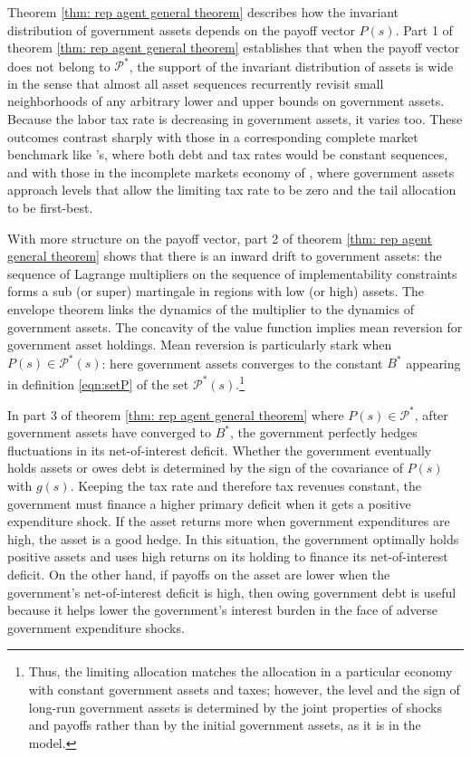 \documentclass[thmsb,11pt]{article}
\begin{document}
\color{black}
Theorem \ref{thm: rep agent general theorem}  describes how  the invariant distribution of government assets depends on the payoff vector $P(s)$.
Part 1 of theorem \ref{thm: rep agent general theorem}  establishes that when the payoff vector does  not belong to $\mathcal{P}^*$, the support of the invariant distribution of assets is wide in the sense that almost all
asset sequences recurrently revisit  small neighborhoods of  any arbitrary lower and upper bounds on government assets.
Because the labor tax rate is decreasing in government assets, it varies too. These outcomes contrast sharply with those   in a corresponding complete market benchmark
like \citeauthor{LucasJr.1983}'s, where both debt and tax rates would be constant  sequences,  and with those in the incomplete markets economy of  \citeauthor{Aiyagari2002},
  where government assets approach levels that allow the  limiting tax rate to be zero and the tail allocation to be first-best.

With more structure on the payoff vector, part 2 of  theorem \ref{thm: rep agent general theorem} shows that there is an  inward drift to government assets:
the sequence of Lagrange multipliers on the sequence of implementability constraints forms a sub (or super) martingale in  regions with low (or high) assets.
The envelope theorem links the dynamics of the multiplier to the dynamics  of government assets.  The concavity of the value function implies
mean reversion for government  asset holdings. Mean reversion is particularly stark when $P(s)\in \mathcal{P}^*(s)$: here  government assets converges to
the constant $B^*$ appearing in  definition \eqref{eqn:setP} of the set $\mathcal{P}^*(s)$.\footnote{Thus, the limiting allocation matches the allocation in
a particular \citeauthor{LucasJr.1983} economy  with constant government  assets and taxes; however,
the level and the sign of long-run government assets is determined by the joint properties of shocks and payoffs rather than
by the initial government assets,  as it is in the \citeauthor{LucasJr.1983} model.}



In part 3 of theorem \ref{thm: rep agent general theorem} where  $P(s)\in\mathcal{P}^*$,
after government assets have converged to $B^*$, %
the government perfectly hedges fluctuations in
its net-of-interest deficit.   Whether the government eventually holds assets or owes  debt is determined
by the sign of the covariance of $P(s)$ with $g(s)$.
Keeping the tax rate and therefore tax revenues constant, the government must finance
a higher primary deficit when it gets a positive expenditure shock.
If the asset returns more when government expenditures are high, the asset is a good hedge. In this situation, the government optimally holds positive assets and uses high returns
on its holding to finance its  net-of-interest deficit. On the other hand,  if  payoffs on the asset  are lower  when the
government's net-of-interest deficit is high, then owing government debt is useful because it helps  lower the government's interest burden in the face of adverse government expenditure shocks.
\end{document}
